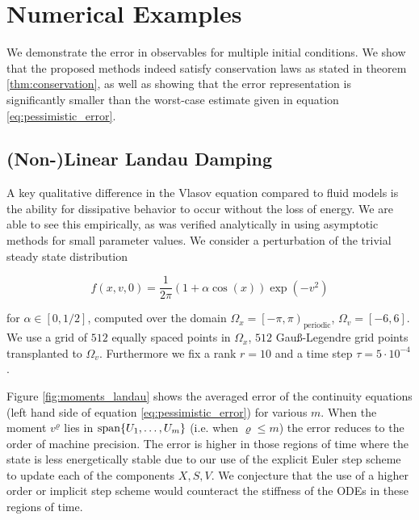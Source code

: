 
\section{Numerical Examples}

We demonstrate the error in observables for multiple initial conditions. We show that 
the proposed methods indeed satisfy conservation laws as stated in theorem 
\ref{thm:conservation}, as well as showing that the error representation is significantly 
smaller than the worst-case estimate given in equation \ref{eq:pessimistic_error}. 

\subsection{(Non-)Linear Landau Damping}\label{sec:landau}

A key qualitative difference in the Vlasov equation compared to fluid models is the 
ability for dissipative behavior to occur without the loss of energy. We are able to 
see this empirically, as was verified analytically in \cite{landau} using asymptotic 
methods for small parameter values. We consider a perturbation of the trivial steady 
state distribution 

\begin{equation}
    f(x, v, 0) = \frac{1}{2 \pi}(1 + \alpha \cos (x)) \exp (-v^2)
\end{equation}

for $\alpha \in \left[ 0, 1/2 \right]$, computed over the domain $\Omega_x =
\left[ -\pi, \pi \right)_{\text{periodic}}$, $\Omega_v = \left[ -6, 6 \right]$.
We use a grid of $512$ equally spaced points in $\Omega_x$, $512$ Gauß-Legendre
grid points transplanted to $\Omega_v$. Furthermore we fix a rank $r = 10$ and a
time step $\tau = 5 \cdot 10^{-4}$. 

Figure \ref{fig:moments_landau} shows the averaged error of the continuity
equations (left hand side of equation \ref{eq:pessimistic_error}) for various
$m$. When the moment $v^\varrho$ lies in $\text{span} \{ U_1, \ldots, U_m \}$ (i.e.
when $\varrho \leq m$) the error reduces to the order of machine precision. The
error is higher in those regions of time where the state is less energetically
stable due to our use of the explicit Euler step scheme to update each of the
components $X, S, V$. We conjecture that the use of a higher order or implicit
step scheme would counteract the stiffness of the ODEs in these regions of time.

